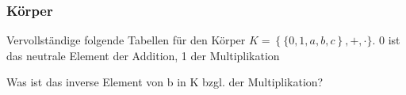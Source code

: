 \documentclass[11pt, a4paper]{article}
\newif\ifshowsolution
\begin{document}
\ifshowsolution
	\begin{enumerate}
		\item[(A1)] $(x \circ y) \circ z = x \circ (y \circ z)$
			\begin{align*}
				(x+y-xy) \circ z &= x \circ (y+z-yz) \\
				x+y-xy + z - z(x+y-xy) &= x+ y+z-yz - x(y+z-yz) \tag*{$-x-y-z$} \\
				-xy - (zx+zy-xyz)&= -yz - (xy+xz-xyz) \\
				-xy - zx - zy + xyz &= -yz - xy - xz + xyz \tag*{- xyz + xy} \\
				- zx - zy &= -yz - xz \tag*{sichtbar gleich}
			\end{align*}
		\item[(A2)] $x \circ y = y \circ x$
			\begin{align*}
				x+y-xy &= y+x-xy \\
				x+y-xy &= x+y-xy
			\end{align*}
		\item[(A3)] $"0" \circ x = x$ (neutrales Element, hier n)
			\begin{align*}
				n \circ x &= x \\
				n+x-nx &= x \\
				\underbrace{(1-n)}_{=1}x &= x \\
				n &= 0
			\end{align*}
		\item[(A4)] $x \circ (-x) = 0$ bzw. $x \circ i = n$
			\begin{align*}
				x + i - xi &= 0 \\
				i - xi &= -x \\
				(1-x)i &= -x \\
				i &= \frac{-x}{1-x} \tag*{$1 \notin G$} \\
				i &= \frac{x}{x-1}
			\end{align*}
	\end{enumerate}
\fi

\subsubsection{Körper}
Vervollständige folgende Tabellen für den Körper $K = \left\{\{0,1,a,b,c\right\}, +, \cdot\} $. 0 ist das neutrale Element der Addition, 1 der Multiplikation

Was ist das inverse Element von b in K bzgl. der Multiplikation?
\end{document}
